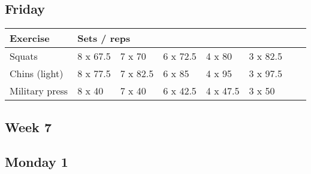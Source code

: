 \documentclass[12pt, a4paper]{article}%
\begin{document}
  \subsection*{\hspace{0.5em} Friday }


  \begin{tabular}{l|lllllll}
  \hspace{0.75em} \textbf{Exercise} & \multicolumn{ 7 }{l}{ \textbf{Sets / reps} } \\ \hline

            \hspace{0.75em} Squats
            & 8 x 67.5
            & 7 x 70
            & 6 x 72.5
            & 4 x 80
            & 3 x 82.5
            & 
            & 
            \\


            \hspace{0.75em} Chins (light)
            & 8 x 77.5
            & 7 x 82.5
            & 6 x 85
            & 4 x 95
            & 3 x 97.5
            & 
            & 
            \\


            \hspace{0.75em} Military press
            & 8 x 40
            & 7 x 40
            & 6 x 42.5
            & 4 x 47.5
            & 3 x 50
            & 
            & 
            \\


  \end{tabular}


\clearpage \subsection*{\hspace{0.25em} Week 7 }
  \subsection*{\hspace{0.5em} Monday 1 }
\end{document}
